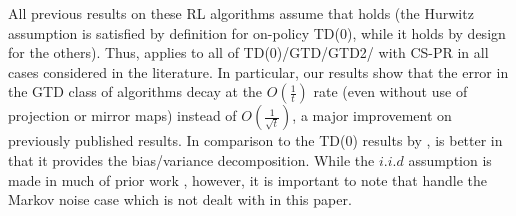 All previous results on these RL algorithms assume that  holds (the Hurwitz assumption is satisfied by definition for on-policy TD(0), while it holds by design for the others). 
Thus,  applies to all of TD(0)/GTD/GTD2/ with CS-PR in all cases considered in the literature.
In particular, our results show that the error in the GTD class of algorithms decay at the $O(\frac{1}{t})$ rate (even without use of projection or mirror maps) instead of $O(\frac{1}{\sqrt{t}})$, a major improvement on previously published results. In comparison to the TD(0) results by \citet{korda-prashanth},  is better in that it provides the bias/variance decomposition. %
While the $i.i.d$ assumption is made in much of prior work \cite{gtd2,gtdmp}, however, it is important to note that \citet{korda-prashanth} handle the Markov noise case which is not dealt with in this paper. 
